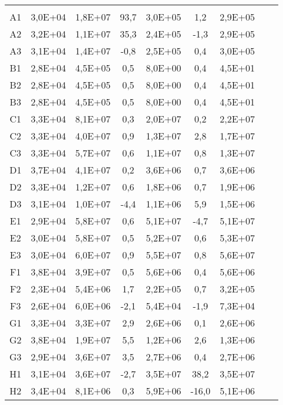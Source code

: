 \begin{center}
\begin{longtable}{ccccccccc}
\toprule
\endhead
\midrule \\ %
\endfoot
\bottomrule 
\endlastfoot
A1    & 3,0E+04 & 1,8E+07 & 93,7  & 3,0E+05 & 1,2   & 2,9E+05 \\
A2    & 3,2E+04 & 1,1E+07 & 35,3  & 2,4E+05 & -1,3  & 2,9E+05 \\
A3    & 3,1E+04 & 1,4E+07 & -0,8  & 2,5E+05 & 0,4   & 3,0E+05 \\
B1    & 2,8E+04 & 4,5E+05 & 0,5   & 8,0E+00 & 0,4   & 4,5E+01 \\
B2    & 2,8E+04 & 4,5E+05 & 0,5   & 8,0E+00 & 0,4   & 4,5E+01 \\
B3    & 2,8E+04 & 4,5E+05 & 0,5   & 8,0E+00 & 0,4   & 4,5E+01 \\
C1    & 3,3E+04 & 8,1E+07 & 0,3   & 2,0E+07 & 0,2   & 2,2E+07 \\
C2    & 3,3E+04 & 4,0E+07 & 0,9   & 1,3E+07 & 2,8   & 1,7E+07 \\
C3    & 3,3E+04 & 5,7E+07 & 0,6   & 1,1E+07 & 0,8   & 1,3E+07 \\
D1    & 3,7E+04 & 4,1E+07 & 0,2   & 3,6E+06 & 0,7   & 3,6E+06 \\
D2    & 3,3E+04 & 1,2E+07 & 0,6   & 1,8E+06 & 0,7   & 1,9E+06 \\
D3    & 3,1E+04 & 1,0E+07 & -4,4  & 1,1E+06 & 5,9   & 1,5E+06 \\
E1    & 2,9E+04 & 5,8E+07 & 0,6   & 5,1E+07 & -4,7  & 5,1E+07 \\
E2    & 3,0E+04 & 5,8E+07 & 0,5   & 5,2E+07 & 0,6   & 5,3E+07 \\
E3    & 3,0E+04 & 6,0E+07 & 0,9   & 5,5E+07 & 0,8   & 5,6E+07 \\
F1    & 3,8E+04 & 3,9E+07 & 0,5   & 5,6E+06 & 0,4   & 5,6E+06 \\
F2    & 2,3E+04 & 5,4E+06 & 1,7   & 2,2E+05 & 0,7   & 3,2E+05 \\
F3    & 2,6E+04 & 6,0E+06 & -2,1  & 5,4E+04 & -1,9  & 7,3E+04 \\
G1    & 3,3E+04 & 3,3E+07 & 2,9   & 2,6E+06 & 0,1   & 2,6E+06 \\
G2    & 3,8E+04 & 1,9E+07 & 5,5   & 1,2E+06 & 2,6   & 1,3E+06 \\
G3    & 2,9E+04 & 3,6E+07 & 3,5   & 2,7E+06 & 0,4   & 2,7E+06 \\
H1    & 3,1E+04 & 3,6E+07 & -2,7  & 3,5E+07 & 38,2  & 3,5E+07 \\
H2    & 3,4E+04 & 8,1E+06 & 0,3   & 5,9E+06 & -16,0 & 5,1E+06 \\

\end{longtable}
\end{center}
